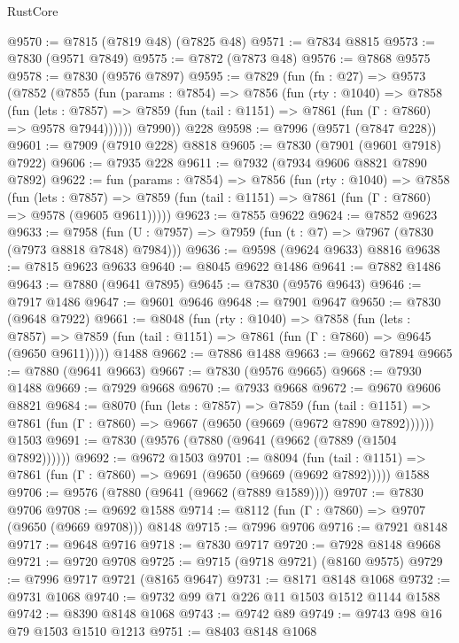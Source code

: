 \begin{lexlean}{RustCore}
\begin{coremodule}
@9570 := @7815 (@7819 @48) (@7825 @48)
@9571 := @7834 @8815
@9573 := @7830 (@9571 @7849)
@9575 := @7872 (@7873 @48)
@9576 := @7868 @9575
@9578 := @7830 (@9576 @7897)
@9595 := @7829
    (fun (fn : @27) =>
    @9573
      (@7852
        (@7855
          (fun (params : @7854) =>
          @7856
            (fun (rty : @1040) =>
            @7858
              (fun (lets : @7857) =>
              @7859 (fun (tail : @1151) => @7861 (fun (Γ : @7860) => @9578 @7944))))))
        @7990))
    @228
@9598 := @7996 (@9571 (@7847 @228))
@9601 := @7909 (@7910 @228) @8818
@9605 := @7830 (@7901 (@9601 @7918) @7922)
@9606 := @7935 @228
@9611 := @7932 (@7934 @9606 @8821 @7890 @7892)
@9622 := fun (params : @7854) =>
  @7856
    (fun (rty : @1040) =>
    @7858
      (fun (lets : @7857) =>
      @7859 (fun (tail : @1151) => @7861 (fun (Γ : @7860) => @9578 (@9605 @9611)))))
@9623 := @7855 @9622
@9624 := @7852 @9623
@9633 := @7958 (fun (U : @7957) => @7959 (fun (t : @7) => @7967 (@7830 (@7973 @8818 @7848) @7984)))
@9636 := @9598 (@9624 @9633) @8816
@9638 := @7815 @9623 @9633
@9640 := @8045 @9622 @1486
@9641 := @7882 @1486
@9643 := @7880 (@9641 @7895)
@9645 := @7830 (@9576 @9643)
@9646 := @7917 @1486
@9647 := @9601 @9646
@9648 := @7901 @9647
@9650 := @7830 (@9648 @7922)
@9661 := @8048
    (fun (rty : @1040) =>
    @7858
      (fun (lets : @7857) =>
      @7859 (fun (tail : @1151) => @7861 (fun (Γ : @7860) => @9645 (@9650 @9611)))))
    @1488
@9662 := @7886 @1488
@9663 := @9662 @7894
@9665 := @7880 (@9641 @9663)
@9667 := @7830 (@9576 @9665)
@9668 := @7930 @1488
@9669 := @7929 @9668
@9670 := @7933 @9668
@9672 := @9670 @9606 @8821
@9684 := @8070
    (fun (lets : @7857) =>
    @7859
      (fun (tail : @1151) => @7861 (fun (Γ : @7860) => @9667 (@9650 (@9669 (@9672 @7890 @7892))))))
    @1503
@9691 := @7830 (@9576 (@7880 (@9641 (@9662 (@7889 (@1504 @7892))))))
@9692 := @9672 @1503
@9701 := @8094
    (fun (tail : @1151) => @7861 (fun (Γ : @7860) => @9691 (@9650 (@9669 (@9692 @7892)))))
    @1588
@9706 := @9576 (@7880 (@9641 (@9662 (@7889 @1589))))
@9707 := @7830 @9706
@9708 := @9692 @1588
@9714 := @8112 (fun (Γ : @7860) => @9707 (@9650 (@9669 @9708))) @8148
@9715 := @7996 @9706
@9716 := @7921 @8148
@9717 := @9648 @9716
@9718 := @7830 @9717
@9720 := @7928 @8148 @9668
@9721 := @9720 @9708
@9725 := @9715 (@9718 @9721) (@8160 @9575)
@9729 := @7996 @9717 @9721 (@8165 @9647)
@9731 := @8171 @8148 @1068
@9732 := @9731 @1068
@9740 := @9732 @99 @71 @226 @11 @1503 @1512 @1144 @1588
@9742 := @8390 @8148 @1068
@9743 := @9742 @89
@9749 := @9743 @98 @16 @79 @1503 @1510 @1213
@9751 := @8403 @8148 @1068

\end{coremodule}
\end{lexlean}
